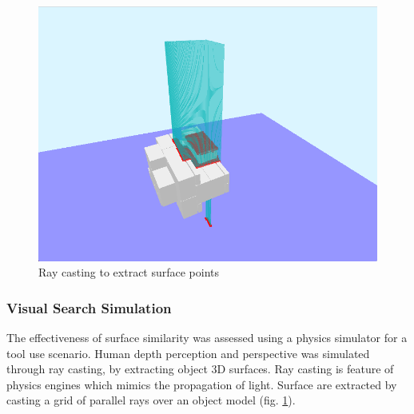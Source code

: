 \documentclass[
    floatsintext
]{article}
\begin{document}
\begin{figure}[h]
  \centering
  \includegraphics[width=.6\textwidth]{./figures/raycasting.png}
  \caption{Ray casting to extract surface points}
  \label{fig:raycasting}
\end{figure}  

\subsubsection{Visual Search Simulation}
The effectiveness of surface similarity was assessed using a physics simulator for a tool use scenario. 
Human depth perception and perspective was simulated through ray casting, by extracting object 3D surfaces. 
Ray casting is feature of physics engines which mimics the propagation of light. 
Surface are extracted by casting a grid of parallel rays over an object model (fig. \ref{fig:raycasting}). 
\end{document}
